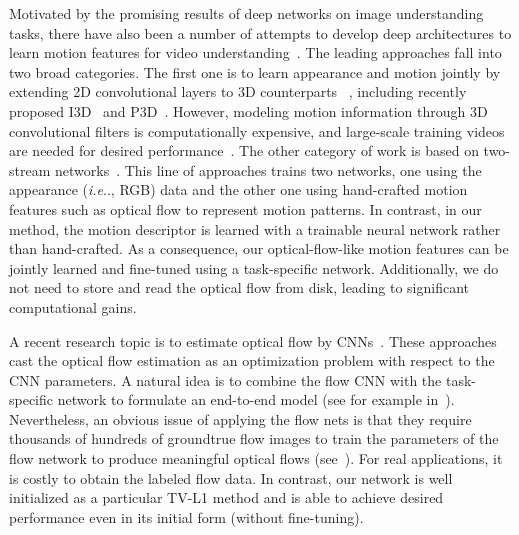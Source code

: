 \documentclass[10pt,twocolumn,letterpaper]{article}
\makeatletter
\DeclareRobustCommand\onedot{\futurelet\@let@token\@onedot}
\def\@onedot{\ifx\@let@token.\else.\null\fi\xspace}
\def\ie{\emph{i.e}\onedot} \def\Ie{\emph{I.e}\onedot}
\makeatother
\begin{document}
Motivated by the promising results of deep networks on image understanding tasks, there have also been a number of attempts to develop
deep architectures to learn motion features for video understanding~\cite{Ji_TPAMI13,Karpathy_CVPR14,Ng_CVPR15,DevNet, Herath_IVC2017,zhang2016real,gan2016you,gan2016webly}.
The leading approaches fall into two broad categories. The first one is to learn appearance and motion jointly by extending 2D convolutional layers to 3D counterparts ~\cite{tran2015learning,Ji_TPAMI13}, including recently proposed I3D~\cite{carreira2017quo} and P3D~\cite{qiu2017learning}. However, modeling motion information through 3D convolutional filters is computationally expensive, and large-scale training videos are needed for desired performance~\cite{carreira2017quo}.
The other category of work is based on two-stream networks~\cite{Simonyan_NIPS14,Ng_CVPR15,Wang_ECCV16,Feichtenhofer_NIPS16,Feichtenhofer_CVPR16,long2017attention}. This line of approaches trains two networks, one using the appearance (\ie, RGB) data and the other one using hand-crafted motion features such as optical flow to represent motion patterns.
In contrast, in our method, the motion descriptor is learned with a trainable neural network rather than hand-crafted. As a consequence, our optical-flow-like motion features can be jointly learned and fine-tuned using a task-specific network. Additionally, we do not need to store and read the optical flow from disk, leading to significant computational gains.


A recent research topic is to estimate optical flow by CNNs~\cite{dosovitskiy2015flownet,teney2016learning,ranjan2016optical,ilg2016flownet,long2017attention,bian2017revisiting}. These approaches cast the optical flow estimation as an optimization problem with respect to the CNN parameters. A natural idea is to combine the flow CNN with the task-specific network to formulate an end-to-end model (see for example in~\cite{zhu2017hidden}). Nevertheless, an obvious issue of applying the flow nets is that they require thousands of hundreds of groundtrue flow images to train the parameters of the flow network to produce meaningful optical flows (see~\cite{dosovitskiy2015flownet}). For real applications, it is costly to obtain the labeled flow data. In contrast, our network is well initialized as a particular TV-L1 method and is able to achieve desired performance even in its initial form (without fine-tuning).
\end{document}
